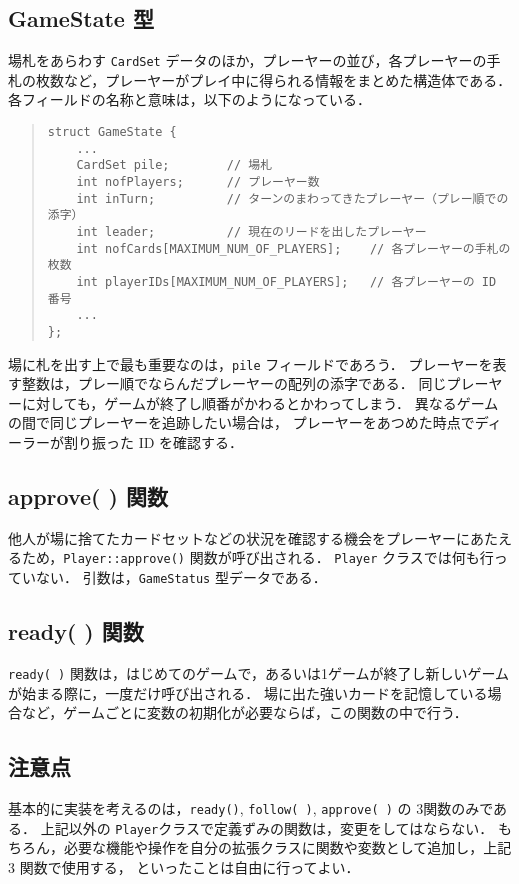 \subsection{GameState 型}

場札をあらわす \verb+CardSet+ データのほか，プレーヤーの並び，各プレーヤーの手札の枚数など，プレーヤーがプレイ中に得られる情報をまとめた構造体である．
各フィールドの名称と意味は，以下のようになっている．
\begin{quote}
\begin{verbatim}
struct GameState {
    ...
	CardSet pile;        // 場札
	int nofPlayers;      // プレーヤー数
	int inTurn;          // ターンのまわってきたプレーヤー（プレー順での添字）
	int leader;          // 現在のリードを出したプレーヤー
	int nofCards[MAXIMUM_NUM_OF_PLAYERS];    // 各プレーヤーの手札の枚数
	int playerIDs[MAXIMUM_NUM_OF_PLAYERS];   // 各プレーヤーの ID 番号
    ...
};
\end{verbatim}
\end{quote}
場に札を出す上で最も重要なのは，\verb+pile+ フィールドであろう．
プレーヤーを表す整数は，プレー順でならんだプレーヤーの配列の添字である．
同じプレーヤーに対しても，ゲームが終了し順番がかわるとかわってしまう．
異なるゲームの間で同じプレーヤーを追跡したい場合は，
プレーヤーをあつめた時点でディーラーが割り振った ID を確認する．

\subsection{approve( ) 関数}
他人が場に捨てたカードセットなどの状況を確認する機会をプレーヤーにあたえるため，\verb+Player::approve()+ 関数が呼び出される．
\verb+Player+ クラスでは何も行っていない．
引数は，\verb+GameStatus+ 型データである．


\subsection{ready( ) 関数}
\verb+ready( )+ 関数は，はじめてのゲームで，あるいは1ゲームが終了し新しいゲームが始まる際に，一度だけ呼び出される．
場に出た強いカードを記憶している場合など，ゲームごとに変数の初期化が必要ならば，この関数の中で行う．

\subsection{注意点}
基本的に実装を考えるのは，\verb+ready()+, \verb+follow( )+, \verb+approve( )+ の 3関数のみである．
上記以外の \verb+Player+クラスで定義ずみの関数は，変更をしてはならない．
もちろん，必要な機能や操作を自分の拡張クラスに関数や変数として追加し，上記 3 関数で使用する，
といったことは自由に行ってよい．

